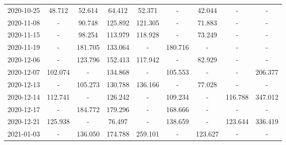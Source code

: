 \begin{table*}[t]
\begin{tabular}{ccccccccc}
2020-10-25 &                         48.712 &   52.614 &                         64.412 &          52.371 &                              - &   {\cellcolor{blue!25} 42.044} &                             - &        - \\
2020-11-08 &                              - &   90.748 &                        125.892 &         121.305 &                              - &   {\cellcolor{blue!25} 71.883} &                             - &        - \\
2020-11-15 &                              - &   98.254 &                        113.979 &         118.928 &                              - &   {\cellcolor{blue!25} 73.249} &                             - &        - \\
2020-11-19 &                              - &  181.705 &  {\cellcolor{blue!25} 133.064} &               - &                        180.716 &                              - &                             - &        - \\
2020-12-06 &                              - &  123.796 &                        152.413 &         117.942 &                              - &   {\cellcolor{blue!25} 82.929} &                             - &        - \\
2020-12-07 &  {\cellcolor{blue!25} 102.074} &        - &                        134.868 &               - &                        105.553 &                              - &                             - &  206.377 \\
2020-12-13 &                              - &  105.273 &                        130.788 &         136.166 &                              - &   {\cellcolor{blue!25} 77.028} &                             - &        - \\
2020-12-14 &                        112.741 &        - &                        126.242 &               - &  {\cellcolor{blue!25} 109.234} &                              - &                       116.788 &  347.012 \\
2020-12-17 &                              - &  184.772 &                        179.296 &               - &  {\cellcolor{blue!25} 168.666} &                              - &                             - &        - \\
2020-12-21 &                        125.938 &        - &   {\cellcolor{blue!25} 76.497} &               - &                        138.659 &                              - &                       123.644 &  336.419 \\
2021-01-03 &                              - &  136.050 &                        174.788 &         259.101 &                              - &  {\cellcolor{blue!25} 123.627} &                             - &        - \\

\end{tabular}
\end{table*}
